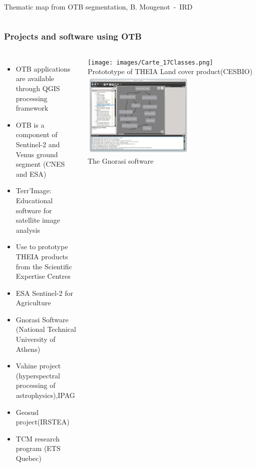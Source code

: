 \documentclass[8pt]{beamer}
\begin{document}
\begin{frame}
\begin{columns}
\tiny{Thematic map from OTB segmentation, B. Mougenot~-~IRD}
\end{columns}
\end{frame}

\begin{frame}
\frametitle{Projects and software using OTB}
\begin{columns}
  \begin{itemize}
    \item OTB applications are available through QGIS processing framework
    \item OTB is a component of \alert{Sentinel-2} and Venus ground segment (CNES and ESA)
    \item Terr'Image: Educational software for satellite image analysis
    \item Use to prototype \alert{THEIA} products from the Scientific Expertise Centres
    \item ESA Sentinel-2 for Agriculture 
    \item Gnorasi Software (National Technical University of Athens)
    \item Vahine project (hyperspectral processing of astrophysics),IPAG
    \item Geosud project(IRSTEA)
    \item TCM research program (ETS Quebec)
  \end{itemize}
  \begin{center}
  \texttt{[image: images/Carte\_17Classes.png]}\\
  \tiny{Protototype of THEIA Land cover product(CESBIO)}
  \includegraphics[width=0.6\textwidth,height=0.35\textheight]{images/gnorasi2.png}\\
  \tiny{The Gnorasi software}
  \end{center}
\end{columns}
\end{frame}
\end{document}
